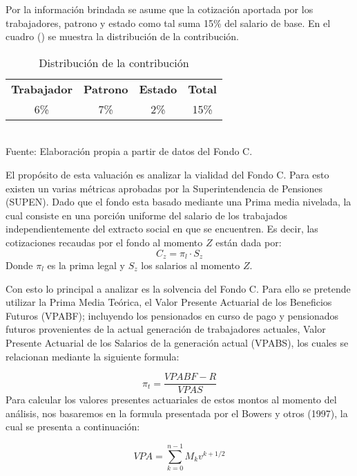 \documentclass[
]{article}
\begin{document}
Por la información brindada se asume que la cotización aportada por los
trabajadores, patrono y estado como tal suma 15\% del salario de base.
En el cuadro () se muestra la distribución de la contribución.

\begin{table}[h]
    \centering
    \caption{Distribución de la contribución}
    \label{tab:contribuciones}
    \vspace{0.25cm}
    \begin{tabular}{|c|c|c|c|}
        \hline
        \rowcolor{turquoise}
        \multicolumn{4}{|c|}{\textbf{Aporte}} \\
        \hline
        \rowcolor{turquoise}
        \textbf{Trabajador} & \textbf{Patrono} & \textbf{Estado} & \textbf{Total} \\
        \hline
        6\% & 7\% & 2\% & 15\% \\
        \hline
    \end{tabular}\\
    \noindent\footnotesize{Fuente: Elaboración propia a partir de datos del Fondo C.}
\end{table}

\newpage

El propósito de esta valuación es analizar la vialidad del Fondo C. Para
esto existen un varias métricas aprobadas por la Superintendencia de
Pensiones (SUPEN). Dado que el fondo esta basado mediante una Prima
media nivelada, la cual consiste en una porción uniforme del salario de
los trabajados independientemente del extracto social en que se
encuentren. Es decir, las cotizaciones recaudas por el fondo al momento
\(Z\) están dada por: \[
C_z =  \pi_l\cdot S_z
\] Donde \(\pi_l\) es la prima legal y \(S_z\) los salarios al momento
\(Z\).

Con esto lo principal a analizar es la solvencia del Fondo C. Para ello
se pretende utilizar la Prima Media Teórica, el Valor Presente Actuarial
de los Beneficios Futuros (VPABF); incluyendo los pensionados en curso
de pago y pensionados futuros provenientes de la actual generación de
trabajadores actuales, Valor Presente Actuarial de los Salarios de la
generación actual (VPABS), los cuales se relacionan mediante la
siguiente formula:

\[
\pi_t = \frac{VPABF-R}{VPAS}
\] Para calcular los valores presentes actuariales de estos montos al
momento del análisis, nos basaremos en la formula presentada por el
Bowers y otros (1997), la cual se presenta a continuación:

\[
VPA = \displaystyle\sum_{k=0}^{n-1}M_kv^{k+1/2}
\]
\end{document}
